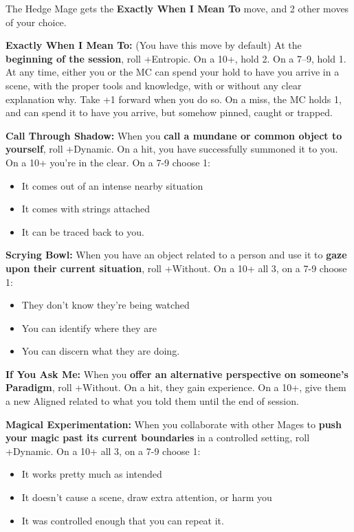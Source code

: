 \documentclass[
  oneside,
  statementpaper,
  9pt]{memoir}
\begin{document}
The Hedge Mage gets the \textbf{Exactly When I Mean To} move, and 2
other moves of your choice.

\textbf{Exactly When I Mean To:} (You have this move by default) At the
\textbf{beginning of the session}, roll +Entropic. On a 10+, hold 2. On
a 7--9, hold 1. At any time, either you or the MC can spend your hold to
have you arrive in a scene, with the proper tools and knowledge, with or
without any clear explanation why. Take +1 forward when you do so. On a
miss, the MC holds 1, and can spend it to have you arrive, but somehow
pinned, caught or trapped.

\textbf{Call Through Shadow:} When you \textbf{call a mundane or common
object to yourself}, roll +Dynamic. On a hit, you have successfully
summoned it to you. On a 10+ you're in the clear. On a 7-9 choose 1:

\begin{itemize}
\tightlist
\item
  It comes out of an intense nearby situation
\item
  It comes with strings attached
\item
  It can be traced back to you.
\end{itemize}

\textbf{Scrying Bowl:} When you have an object related to a person and
use it to \textbf{gaze upon their current situation}, roll +Without. On
a 10+ all 3, on a 7-9 choose 1:

\begin{itemize}
\tightlist
\item
  They don't know they're being watched
\item
  You can identify where they are
\item
  You can discern what they are doing.
\end{itemize}

\textbf{If You Ask Me:} When you \textbf{offer an alternative
perspective on someone's Paradigm}, roll +Without. On a hit, they gain
experience. On a 10+, give them a new Aligned related to what you told
them until the end of session.

\textbf{Magical Experimentation:} When you collaborate with other Mages
to \textbf{push your magic past its current boundaries} in a controlled
setting, roll +Dynamic. On a 10+ all 3, on a 7-9 choose 1:

\begin{itemize}
\tightlist
\item
  It works pretty much as intended
\item
  It doesn't cause a scene, draw extra attention, or harm you
\item
  It was controlled enough that you can repeat it.
\end{itemize}
\end{document}
